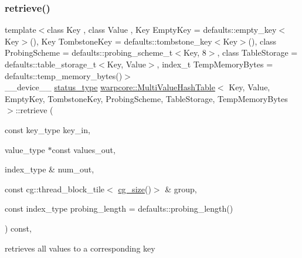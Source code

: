 \subsubsection{\texorpdfstring{retrieve()}{retrieve()}\hspace{0.1cm}{\footnotesize\ttfamily [1/2]}}
{\footnotesize\ttfamily template$<$class Key , class Value , Key Empty\+Key = defaults\+::empty\+\_\+key$<$\+Key$>$(), Key Tombstone\+Key = defaults\+::tombstone\+\_\+key$<$\+Key$>$(), class Probing\+Scheme  = defaults\+::probing\+\_\+scheme\+\_\+t$<$\+Key, 8$>$, class Table\+Storage  = defaults\+::table\+\_\+storage\+\_\+t$<$\+Key, Value$>$, index\+\_\+t Temp\+Memory\+Bytes = defaults\+::temp\+\_\+memory\+\_\+bytes()$>$ \\
\+\_\+\+\_\+device\+\_\+\+\_\+ \hyperlink{classwarpcore_1_1Status}{status\+\_\+type} \hyperlink{classwarpcore_1_1MultiValueHashTable}{warpcore\+::\+Multi\+Value\+Hash\+Table}$<$ Key, Value, Empty\+Key, Tombstone\+Key, Probing\+Scheme, Table\+Storage, Temp\+Memory\+Bytes $>$\+::retrieve (\begin{DoxyParamCaption}\item[{const key\+\_\+type}]{key\+\_\+in,  }\item[{value\+\_\+type $\ast$const}]{values\+\_\+out,  }\item[{index\+\_\+type \&}]{num\+\_\+out,  }\item[{const cg\+::thread\+\_\+block\+\_\+tile$<$ \hyperlink{classwarpcore_1_1MultiValueHashTable_ad300c5a01bd933343ff08176fb4b4e29}{cg\+\_\+size}()$>$ \&}]{group,  }\item[{const index\+\_\+type}]{probing\+\_\+length = {\ttfamily defaults\+:\+:probing\+\_\+length()} }\end{DoxyParamCaption}) const\hspace{0.3cm}{\ttfamily [inline]}, {\ttfamily [noexcept]}}



retrieves all values to a corresponding key 



